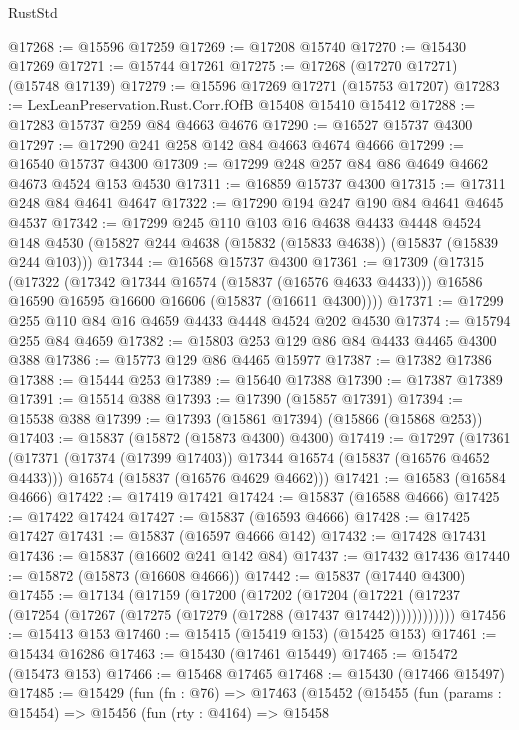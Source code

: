 \begin{lexlean}{RustStd}
\begin{coremodule}
{\begin{coremodule}
{{{{{{{{{{{{{{{{{{{{{{{{{{{{{{{{{{{{{{{{{{{{{{{{{{{{{{{{{{{{@17268 := @15596 @17259
@17269 := @17208 @15740
@17270 := @15430 @17269
@17271 := @15744 @17261
@17275 := @17268 (@17270 @17271) (@15748 @17139)
@17279 := @15596 @17269 @17271 (@15753 @17207)
@17283 := LexLeanPreservation.Rust.Corr.fOfB @15408 @15410 @15412
@17288 := @17283 @15737 @259 @84 @4663 @4676
@17290 := @16527 @15737 @4300
@17297 := @17290 @241 @258 @142 @84 @4663 @4674 @4666
@17299 := @16540 @15737 @4300
@17309 := @17299 @248 @257 @84 @86 @4649 @4662 @4673 @4524 @153 @4530
@17311 := @16859 @15737 @4300
@17315 := @17311 @248 @84 @4641 @4647
@17322 := @17290 @194 @247 @190 @84 @4641 @4645 @4537
@17342 := @17299
    @245
    @110
    @103
    @16
    @4638
    @4433
    @4448
    @4524
    @148
    @4530
    (@15827 @244 @4638 (@15832 (@15833 @4638)) (@15837 (@15839 @244 @103)))
@17344 := @16568 @15737 @4300
@17361 := @17309
    (@17315
      (@17322
        (@17342 @17344 @16574 (@15837 (@16576 @4633 @4433)))
        @16586
        @16590
        @16595
        @16600
        @16606
        (@15837 (@16611 @4300))))
@17371 := @17299 @255 @110 @84 @16 @4659 @4433 @4448 @4524 @202 @4530
@17374 := @15794 @255 @84 @4659
@17382 := @15803 @253 @129 @86 @84 @4433 @4465 @4300 @388
@17386 := @15773 @129 @86 @4465 @15977
@17387 := @17382 @17386
@17388 := @15444 @253
@17389 := @15640 @17388
@17390 := @17387 @17389
@17391 := @15514 @388
@17393 := @17390 (@15857 @17391)
@17394 := @15538 @388
@17399 := @17393 (@15861 @17394) (@15866 (@15868 @253))
@17403 := @15837 (@15872 (@15873 @4300) @4300)
@17419 := @17297
    (@17361
      (@17371 (@17374 (@17399 @17403)) @17344 @16574 (@15837 (@16576 @4652 @4433)))
      @16574
      (@15837 (@16576 @4629 @4662)))
@17421 := @16583 (@16584 @4666)
@17422 := @17419 @17421
@17424 := @15837 (@16588 @4666)
@17425 := @17422 @17424
@17427 := @15837 (@16593 @4666)
@17428 := @17425 @17427
@17431 := @15837 (@16597 @4666 @142)
@17432 := @17428 @17431
@17436 := @15837 (@16602 @241 @142 @84)
@17437 := @17432 @17436
@17440 := @15872 (@15873 (@16608 @4666))
@17442 := @15837 (@17440 @4300)
@17455 := @17134
    (@17159
      (@17200
        (@17202
          (@17204 (@17221 (@17237 (@17254 (@17267 (@17275 (@17279 (@17288 (@17437 @17442))))))))))))
@17456 := @15413 @153
@17460 := @15415 (@15419 @153) (@15425 @153)
@17461 := @15434 @16286
@17463 := @15430 (@17461 @15449)
@17465 := @15472 (@15473 @153)
@17466 := @15468 @17465
@17468 := @15430 (@17466 @15497)
@17485 := @15429
    (fun (fn : @76) =>
    @17463
      (@15452
        (@15455
          (fun (params : @15454) =>
          @15456
            (fun (rty : @4164) =>
            @15458
}}}}}}}}}}}}}}}}}}}}}}}}}}}}}}}}}}}}}}}}}}}}}}}}}}}}}}}}}}}}
\end{coremodule}}
\end{coremodule}
\end{lexlean}
